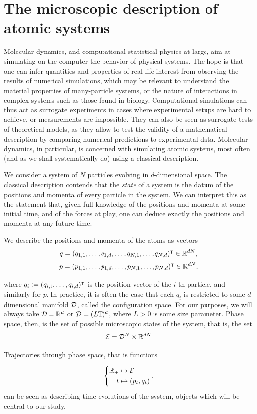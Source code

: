 \section{The microscopic description of atomic systems}
Molecular dynamics, and computational statistical physics at large, aim at simulating on the computer the behavior of physical systems.
The hope is that one can infer quantities and properties of real-life interest from observing the results of numerical simulations, which may be relevant to understand the material properties of many-particle systems, or the nature of interactions in complex systems such as those found in biology.
Computational simulations can thus act as surrogate experiments in cases where experimental setups are hard to achieve, or measurements are impossible.
They can also be seen as surrogate tests of theoretical models, as they allow to test the validity of a mathematical description by comparing numerical predictions to experimental data. Molecular dynamics, in particular, is concerned with simulating atomic systems, most often (and as we shall systematically do) using a classical description.


We consider a system of $N$ particles evolving in $d$-dimensional space. The classical description contends that the \textit{state} of a system is the datum of the positions and momenta of every particle in the system. We can interpret this as the statement that, given full knowledge of the positions and momenta at some initial time, and of the forces at play, one can deduce exactly the positions and momenta at any future time.

\begin{definition}

    We describe the positions and momenta of the atoms as vectors
    $$ q=(q_{1,1},\dots,q_{1,d},\dots ,q_{N,1},\dots,q_{N,d})^\intercal \in \mathbb{R}^{dN},$$
    $$ p=(p_{1,1},\dots,p_{1,d},\dots ,p_{N,1},\dots,p_{N,d})^\intercal \in \mathbb{R}^{dN},$$

    where $q_i \mathrel{\mathop:}= (q_{i,1},\dots, q_{i,d})^\intercal$ is the position vector of the $i$-th particle, and similarly for $p$. 
    In practice, it is often the case that each $q_i$ is restricted to some $d$-dimensional manifold $\mathcal{D}$, called the configuration space. For our purposes, we will always take $\mathcal{D}=\mathbb{R}^{d}$ or $\mathcal{D}=(L\mathbb T)^{d}$, where $L>0$ is some size parameter. Phase space, then, is the set of possible microscopic states of the system, that is, the set
    $$\mathcal E=\mathcal{D}^{N} \times \mathbb{R} ^{dN}$$

    Trajectories through phase space, that is functions

    $$\left\{\begin{aligned} \mathbb{R}_+  &\mapsto \mathcal E \\ 
                            t  &\mapsto  (p_t,q_t)\end{aligned}\right.,$$
    can be seen as describing time evolutions of the system, objects which will be central to our study.
\end{definition}

